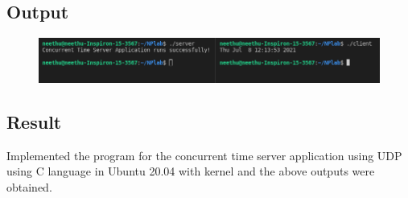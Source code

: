 \subsection{Output}
\begin{figure}[h]
            \centering
            \includegraphics[scale=0.56]{img/exp10.png}
\end{figure}

\subsection{Result}
Implemented the program for the concurrent time server application using UDP using C language in Ubuntu 20.04 with kernel and the above outputs were obtained.

